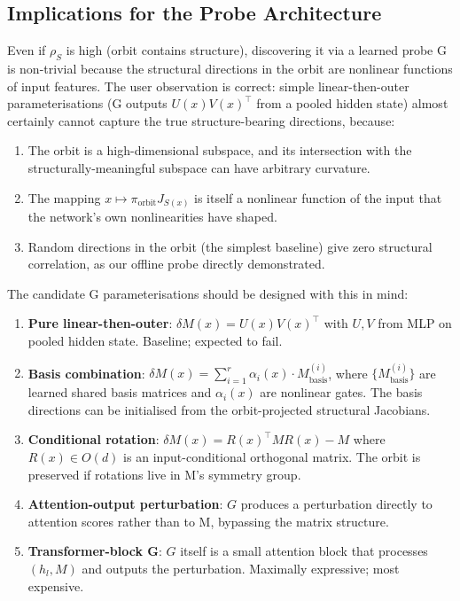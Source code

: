 \documentclass[11pt, a4paper]{article}
\theoremstyle{plain}
\theoremstyle{definition}
\theoremstyle{remark}
\begin{document}
\subsection{Implications for the Probe Architecture}

Even if $\rho_S$ is high (orbit contains structure), discovering it via a learned probe G is non-trivial because the structural directions in the orbit are nonlinear functions of input features.
The user observation is correct: simple linear-then-outer parameterisations (G outputs $U(x) V(x)^{\!\top}$ from a pooled hidden state) almost certainly cannot capture the true structure-bearing directions, because:

\begin{enumerate}[nosep]
\item The orbit is a high-dimensional subspace, and its intersection with the structurally-meaningful subspace can have arbitrary curvature.
\item The mapping $x \mapsto \pi_{\text{orbit}} J_{S(x)}$ is itself a nonlinear function of the input that the network's own nonlinearities have shaped.
\item Random directions in the orbit (the simplest baseline) give zero structural correlation, as our offline probe directly demonstrated.
\end{enumerate}

The candidate G parameterisations should be designed with this in mind:

\begin{enumerate}[nosep]
\item \textbf{Pure linear-then-outer}: $\delta M(x) = U(x) V(x)^{\!\top}$ with $U, V$ from MLP on pooled hidden state. Baseline; expected to fail.
\item \textbf{Basis combination}: $\delta M(x) = \sum_{i=1}^{r} \alpha_i(x) \cdot M^{(i)}_{\text{basis}}$, where $\{M^{(i)}_{\text{basis}}\}$ are learned shared basis matrices and $\alpha_i(x)$ are nonlinear gates. The basis directions can be initialised from the orbit-projected structural Jacobians.
\item \textbf{Conditional rotation}: $\delta M(x) = R(x)^{\!\top} M R(x) - M$ where $R(x) \in O(d)$ is an input-conditional orthogonal matrix. The orbit is preserved if rotations live in M's symmetry group.
\item \textbf{Attention-output perturbation}: $G$ produces a perturbation directly to attention scores rather than to M, bypassing the matrix structure.
\item \textbf{Transformer-block G}: $G$ itself is a small attention block that processes $(h_l, M)$ and outputs the perturbation. Maximally expressive; most expensive.
\end{enumerate}
\end{document}
